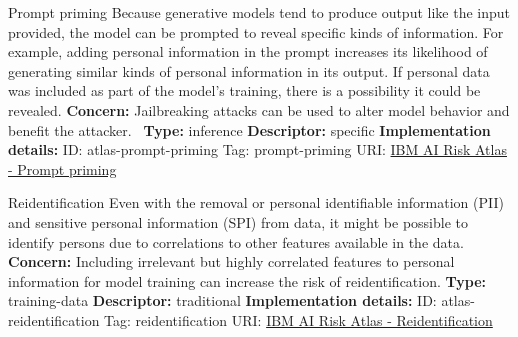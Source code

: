 \documentclass[a4paper,12pt]{article}
\begin{document}
\begin{definitionbox}{Prompt priming}
Because generative models tend to produce output like the input provided, the model can be prompted to reveal specific kinds of information. For example, adding personal information in the prompt increases its likelihood of generating similar kinds of personal information in its output. If personal data was included as part of the model's training, there is a possibility it could be revealed.\newline\newline
\textbf{Concern: }Jailbreaking attacks can be used to alter model behavior and benefit the attacker. \newline\newline
\textbf{Type: }inference\newline
\textbf{Descriptor: }specific \newline\newline
\textbf{Implementation details: } \newline
ID: atlas-prompt-priming \newline
Tag: prompt-priming \newline
URI:  \href{https://www.ibm.com/docs/en/watsonx/saas?topic=SSYOK8/wsj/ai-risk-atlas/prompt-priming.html}{IBM AI Risk Atlas - Prompt priming}\newline
\end{definitionbox}
\begin{definitionbox}{Reidentification}
Even with the removal or personal identifiable information (PII) and sensitive personal information (SPI) from data, it might be possible to identify persons due to correlations to other features available in the data.\newline\newline
\textbf{Concern: }Including irrelevant but highly correlated features to personal information for model training can increase the risk of reidentification.\newline\newline
\textbf{Type: }training-data\newline
\textbf{Descriptor: }traditional \newline\newline
\textbf{Implementation details: } \newline
ID: atlas-reidentification \newline
Tag: reidentification \newline
URI:  \href{https://www.ibm.com/docs/en/watsonx/saas?topic=SSYOK8/wsj/ai-risk-atlas/reidentification.html}{IBM AI Risk Atlas - Reidentification}\newline
\end{definitionbox}
\end{document}
